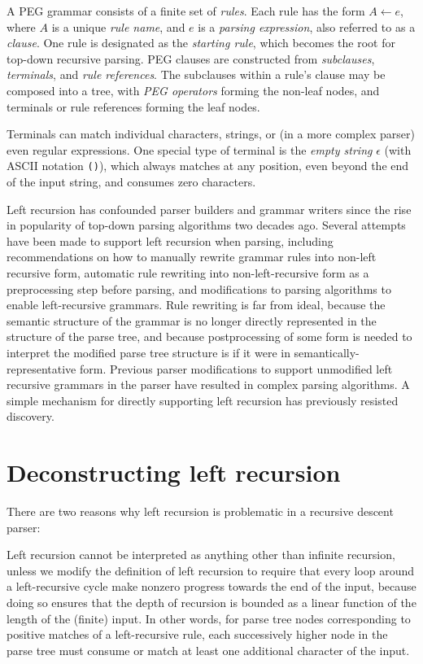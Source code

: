 \documentclass[manuscript]{acmart}
\begin{document}
A PEG grammar consists of a finite set of \emph{rules}. Each rule has the form $A \leftarrow e$, where $A$ is a unique \emph{rule name}, and $e$ is a \emph{parsing expression}, also referred to as a \emph{clause}. One rule is designated as the \emph{starting rule}, which becomes the root for top-down recursive parsing. PEG clauses are constructed from \emph{subclauses}, \emph{terminals}, and \emph{rule references}. The subclauses within a rule's clause may be composed into a tree, with \emph{PEG operators} forming the non-leaf nodes, and terminals or rule references forming the leaf nodes.

Terminals can match individual characters, strings, or (in a more complex parser) even regular expressions. One special type of terminal is the \emph{empty string} $\epsilon$ (with ASCII notation \texttt{()}), which always matches at any position, even beyond the end of the input string, and consumes zero characters.



Left recursion has confounded parser builders and grammar writers since the rise in popularity of top-down parsing algorithms two decades ago. Several attempts have been made to support left recursion when parsing, including recommendations on how to manually rewrite grammar rules into non-left recursive form, automatic rule rewriting into non-left-recursive form as a preprocessing step before parsing, and modifications to parsing algorithms to enable left-recursive grammars. Rule rewriting is far from ideal, because the semantic structure of the grammar is no longer directly represented in the structure of the parse tree, and because postprocessing of some form is needed to interpret the modified parse tree structure is if it were in semantically-representative form. Previous parser modifications to support unmodified left recursive grammars in the parser have resulted in complex parsing algorithms. A simple mechanism for directly supporting left recursion has previously resisted discovery.

\section{Deconstructing left recursion}

There are two reasons why left recursion is problematic in a recursive descent parser:



Left recursion cannot be interpreted as anything other than infinite recursion, unless we modify the definition of left recursion to require that every loop around a left-recursive cycle make nonzero progress towards the end of the input, because doing so ensures that the depth of recursion is bounded as a linear function of the length of the (finite) input. In other words, for parse tree nodes corresponding to positive matches of a left-recursive rule, each successively higher node in the parse tree must consume or match at least one additional character of the input.
\end{document}
